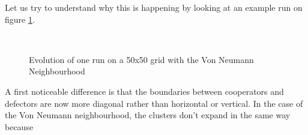 \documentclass[a4paper]{article}
\begin{document}
Let us try to understand why this is happening by looking at an example run
on figure \ref{vnviz}.

\begin{figure}[H]
	\centering
	\\
	\caption{Evolution of one run on a 50x50 grid with the Von Neumann
	Neighbourhood}
	\label{vnviz}
\end{figure}

A first noticeable difference is that the boundaries between cooperators and
defectors are now more diagonal rather than horizontal or vertical. In the 
case of the Von Neumann neighbourhood, the clusters don't expand in the same
way because
\end{document}
